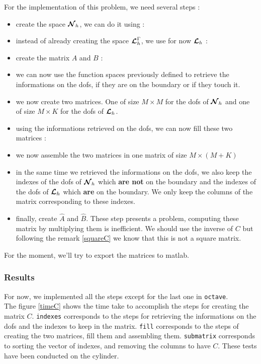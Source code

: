For the implementation of this problem, we need several steps :
\begin{itemize}
\item create the space ${\bm{\mathcal{N}}}_h$, we can do it using :

\item instead of already creating the space ${\bm{\mathcal{L}}}_h^\Gamma$, we use for now ${\bm{\mathcal{L}}}_h$ :

\item create the matrix $A$ and $B$ :

\item we can now use the function spaces previously defined to retrieve the informations on the dofs, if they are on the boundary or if they touch it.
\item we now create two matrices. One of size $M\times M$ for the dofs of ${\bm{\mathcal{N}}}_h$ and one of size $M\times K$ for the dofs of ${\bm{\mathcal{L}}}_h$.

\item using the informations retrieved on the dofs, we can now fill these two matrices :

\item we now assemble the two matrices in one matrix of size $M\times (M+K)$

\item in the same time we retrieved the informations on the dofs, we also keep the indexes of the dofs of ${\bm{\mathcal{N}}}_h$ which {\bf are not} on the boundary and the indexes of the dofs of ${\bm{\mathcal{L}}}_h$ which {\bf are} on the boundary. We only keep the columns of the matrix corresponding to these indexes.

\item finally, create $\widehat{A}$ and $\widehat{B}$. These step presents a
  problem, computing these matrix by multiplying them is inefficient. We should
  use the inverse of $C$ but following the remark \ref{squareC} we know that this is not a square matrix.
\end{itemize}

For the moment, we'll try to export the matrices to matlab.

\subsubsection{Results}

For now, we implemented all the steps except for the last one in \texttt{octave}.\\
The figure \ref{timeC} shows the time take to accomplish the steps for creating the matrix $C$. \texttt{indexes} corresponds to the steps for retrieving the informations on the dofs and the indexes to keep in the matrix. \texttt{fill} corresponds to the steps of creating the two matrices, fill them and assembling them. \texttt{submatrix} corresponds to sorting the vector of indexes, and removing the columns to have $C$. These tests have been conducted on the cylinder.\\


